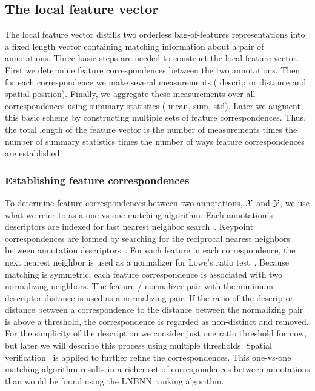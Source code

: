 \subsection{The local feature vector}
The local feature vector distills two orderless bag-of-features representations into a fixed length vector
  containing matching information about a pair of annotations.
Three basic steps are needed to construct the local feature vector.
First we determine feature correspondences between the two annotations.
Then for each correspondence we make several measurements (\eg{} descriptor distance and spatial position).
Finally, we aggregate these measurements over all correspondences using summary statistics (\eg{} mean, sum,
  std).
Later we augment this basic scheme by constructing multiple sets of feature correspondences.
Thus, the total length of the feature vector is the number of measurements times the number of summary statistics
  times the number of ways feature correspondences are established.


\subsubsection{Establishing feature correspondences}
To determine feature correspondences between two annotations, $\mathcal{X}$ and $\mathcal{Y}$, we use what we refer to as a
  one-vs-one matching algorithm.
Each annotation's descriptors are indexed for fast nearest neighbor search~\cite{muja_fast_2009}.
Keypoint correspondences are formed by searching for the reciprocal nearest neighbors between annotation
  descriptors~\cite{qin_hello_2011}.
For each feature in each correspondence, the next nearest neighbor is used as a normalizer for Lowe's ratio
  test~\cite{lowe_distinctive_2004}.
Because matching is symmetric, each feature correspondence is associated with two normalizing neighbors.
The feature / normalizer pair with the minimum descriptor distance is used as a normalizing pair.
If the ratio of the descriptor distance between a correspondence to the distance between the normalizing pair is
  above a threshold, the correspondence is regarded as non-distinct and removed.
For the simplicity of the description we consider just one ratio threshold for now, but later we will describe
  this process using multiple thresholds.
Spatial verification~\cite{philbin_object_2007} is applied to further refine the correspondences.
This one-vs-one matching algorithm results in a richer set of correspondences between annotations than would be
  found using the LNBNN ranking algorithm.

